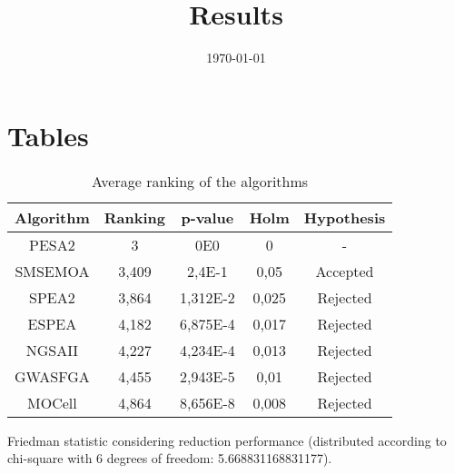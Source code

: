 \documentclass{article}
\title{Results}
\author{}
\date{\today}
\begin{document}
\oddsidemargin 0in \topmargin 0in\maketitle

\section{Tables}
\begin{table}[!htp]
\centering
\begin{tabular}{c|c|c|c|c}
Algorithm&Ranking&p-value&Holm&Hypothesis\\
\hline
PESA2 & 3 & 0E0 & 0 & -\\
SMSEMOA & 3,409 & 2,4E-1 & 0,05 & Accepted\\
SPEA2 & 3,864 & 1,312E-2 & 0,025 & Rejected\\
ESPEA & 4,182 & 6,875E-4 & 0,017 & Rejected\\
NGSAII & 4,227 & 4,234E-4 & 0,013 & Rejected\\
GWASFGA & 4,455 & 2,943E-5 & 0,01 & Rejected\\
MOCell & 4,864 & 8,656E-8 & 0,008 & Rejected\\
\end{tabular}
\caption{Average ranking of the algorithms}
\end{table}


Friedman statistic considering reduction performance (distributed according to chi-square with 6 degrees of freedom: 5.668831168831177).
\end{document}
